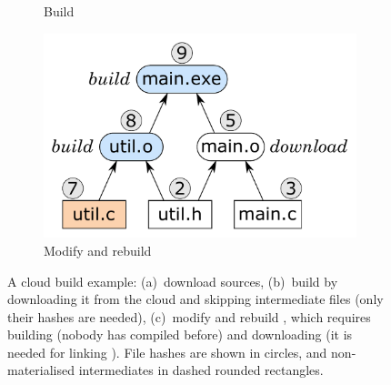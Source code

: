 \begin{figure}
\begin{subfigure}[b]{0.40\linewidth}
\caption{Build }
\end{subfigure}
\begin{subfigure}[b]{0.31\linewidth}
\centerline{\includegraphics[scale=0.28]{fig/bazel-example-rebuild.pdf}}
\caption{Modify  and rebuild}
\end{subfigure}
\caption{A cloud build example: (a)~download sources, (b)~build 
by downloading it from the cloud and skipping intermediate files (only their
hashes are needed), (c)~modify  and rebuild , which
requires building  (nobody has compiled  before) and
downloading  (it is needed for linking ). File hashes
are shown in circles, and non-materialised intermediates in dashed rounded
rectangles.\label{fig-bazel}}
\end{figure}

